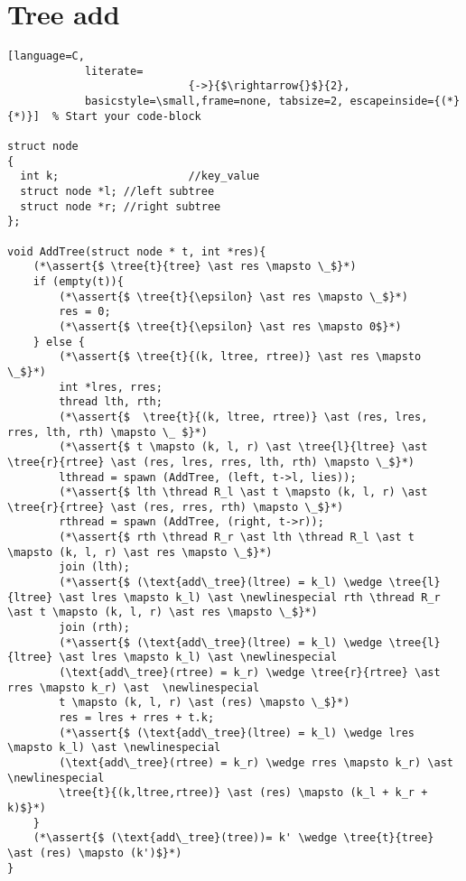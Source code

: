 \documentclass[8pt]{article}
\newcommand{\thread}{\ocircle \hspace{-1ex} \rightarrow}
\newcommand{\assert}[1]{\textcolor{blue}{ \{ #1 \}  } }
\newcommand{\tree}[2]{#1 \rightarrowtail #2}
\newcommand{\newlinespecial}{\newline \hphantom{100pt}}
\begin{document}
\section{Tree add}
\begin{lstlisting}[language=C,
			literate=
               				{->}{$\rightarrow{}$}{2},
			basicstyle=\small,frame=none, tabsize=2, escapeinside={(*}{*)}]  % Start your code-block

struct node
{
  int k;					//key_value
  struct node *l; //left subtree
  struct node *r; //right subtree
};

void AddTree(struct node * t, int *res){
	(*\assert{$ \tree{t}{tree} \ast res \mapsto \_$}*)
	if (empty(t)){
		(*\assert{$ \tree{t}{\epsilon} \ast res \mapsto \_$}*)
		res = 0;
		(*\assert{$ \tree{t}{\epsilon} \ast res \mapsto 0$}*)
	} else {
		(*\assert{$ \tree{t}{(k, ltree, rtree)} \ast res \mapsto \_$}*)
		int *lres, rres;
		thread lth, rth;
		(*\assert{$  \tree{t}{(k, ltree, rtree)} \ast (res, lres, rres, lth, rth) \mapsto \_ $}*)
		(*\assert{$ t \mapsto (k, l, r) \ast \tree{l}{ltree} \ast \tree{r}{rtree} \ast (res, lres, rres, lth, rth) \mapsto \_$}*)
		lthread = spawn (AddTree, (left, t->l, lies));
		(*\assert{$ lth \thread R_l \ast t \mapsto (k, l, r) \ast \tree{r}{rtree} \ast (res, rres, rth) \mapsto \_$}*)
		rthread = spawn (AddTree, (right, t->r));
		(*\assert{$ rth \thread R_r \ast lth \thread R_l \ast t \mapsto (k, l, r) \ast res \mapsto \_$}*)
		join (lth);
		(*\assert{$ (\text{add\_tree}(ltree) = k_l) \wedge \tree{l}{ltree} \ast lres \mapsto k_l) \ast \newlinespecial rth \thread R_r \ast t \mapsto (k, l, r) \ast res \mapsto \_$}*)
		join (rth);
		(*\assert{$ (\text{add\_tree}(ltree) = k_l) \wedge \tree{l}{ltree} \ast lres \mapsto k_l) \ast \newlinespecial
		(\text{add\_tree}(rtree) = k_r) \wedge \tree{r}{rtree} \ast rres \mapsto k_r) \ast  \newlinespecial 
		t \mapsto (k, l, r) \ast (res) \mapsto \_$}*)
		res = lres + rres + t.k;
		(*\assert{$ (\text{add\_tree}(ltree) = k_l) \wedge lres \mapsto k_l) \ast \newlinespecial
		(\text{add\_tree}(rtree) = k_r) \wedge rres \mapsto k_r) \ast  \newlinespecial 
		\tree{t}{(k,ltree,rtree)} \ast (res) \mapsto (k_l + k_r + k)$}*)
	} 	
	(*\assert{$ (\text{add\_tree}(tree))= k' \wedge \tree{t}{tree} \ast (res) \mapsto (k')$}*)
}		

\end{lstlisting}


\end{document}

